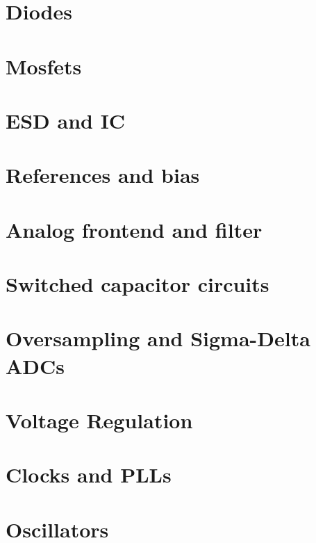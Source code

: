 \documentclass[11pt,twoside,openright]{book}
\begin{document}
\chapter{Diodes}


\chapter{Mosfets}


\chapter{ESD and IC}


\chapter{References and bias}


\chapter{Analog frontend and filter}


\chapter{Switched capacitor circuits}


\chapter{Oversampling and Sigma-Delta ADCs}


\chapter{Voltage Regulation}


\chapter{Clocks and PLLs}


\chapter{Oscillators}

\end{document}
